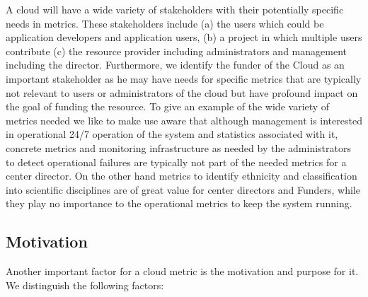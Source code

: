 \documentclass{sig-alternate-05-2015}
\begin{document}
A cloud will have a wide variety of stakeholders with their
potentially specific needs in metrics. These stakeholders include (a)
the users which could be application developers and application users,
(b) a project in which multiple users contribute (c) the resource
provider including administrators and management including the
director. Furthermore, we identify the funder of the Cloud as an
important stakeholder as he may have needs for specific metrics that
are typically not relevant to users or administrators of the cloud but
have profound impact on the goal of funding the resource. To give an
example of the wide variety of metrics needed we like to make use
aware that although management is interested in operational 24/7
operation of the system and statistics associated with it, concrete
metrics and monitoring infrastructure as needed by the administrators
to detect operational failures are typically not part of the needed
metrics for a center director. On the other hand metrics to identify
ethnicity and classification into scientific disciplines are of great
value for center directors and Funders, while they play no importance
to the operational metrics to keep the system running.

\subsection{Motivation}

Another important factor for a cloud metric is the motivation and
purpose for it. We distinguish
the following factors:
\end{document}
